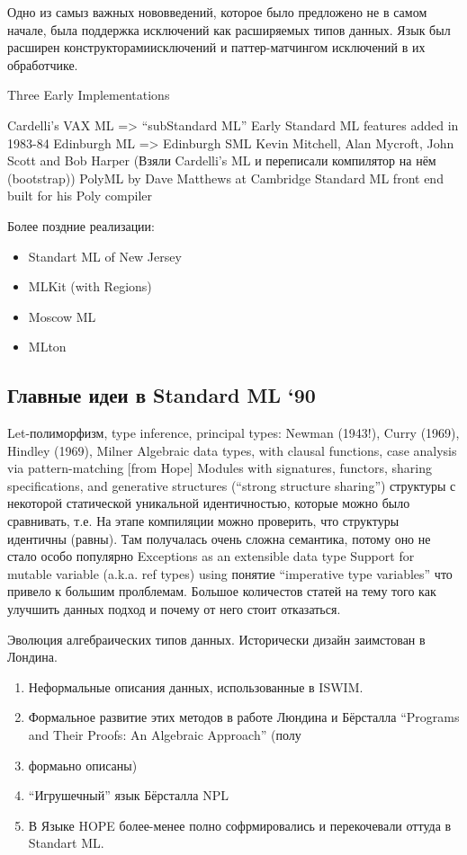 \documentclass[14pt]{matmex-diploma-custom}
\begin{document}
Одно из самыз важных нововведений, которое было предложено не в самом начале, была поддержка исключений как расширяемых типов данных. Язык был расширен конструкторамиисключений и паттер-матчингом исключений в их обработчике. 

Three Early Implementations

Cardelli’s VAX ML => “subStandard ML”
Early Standard ML features added in 1983-84
Edinburgh ML => Edinburgh SML
Kevin Mitchell, Alan Mycroft, John Scott and Bob Harper (Взяли Cardelli’s ML и переписали компилятор на нём (bootstrap))
PolyML by Dave Matthews at Cambridge
Standard ML front end built for his Poly compiler

Более поздние реализации:
\begin{itemize}
 \item Standart ML of New Jersey
 \item MLKit (with Regions)
 \item Moscow ML
 \item MLton
\end{itemize}

\subsection{ Главные идеи в  Standard ML ‘90}
Let-полиморфизм, type inference, principal types: Newman (1943!), Curry (1969), Hindley (1969), Milner
Algebraic data types, with clausal functions, case analysis via pattern-matching [from Hope]
Modules with signatures, functors, sharing specifications, and generative structures (“strong structure sharing”) структуры  с  некоторой статической уникальной идентичностью, которые  можно было сравнивать, т.е. На этапе компиляции можно проверить, что структуры идентичны (равны). Там получалась очень сложна семантика, потому оно не стало особо популярно
Exceptions as an extensible data type
Support for mutable variable (a.k.a. ref types) using понятие “imperative type variables” что привело к большим пролблемам. Большое количестов статей на тему того как улучшить данных подход и почему от него стоит отказаться.

Эволюция алгебраических типов данных.
Исторически дизайн заимстован в Лондина. 
\begin{enumerate}
\item Неформальные описания данных, использованные в ISWIM.
\item Формальное развитие этих методов в работе Люндина и Бёрсталла “Programs and Their Proofs: An Algebraic Approach” (полу \item формаьно описаны)
\item “Игрушечный” язык Бёрсталла NPL
\item В Языке HOPE более-менее полно софрмировались и перекочевали оттуда в Standart ML.
\end{enumerate}
\end{document}

